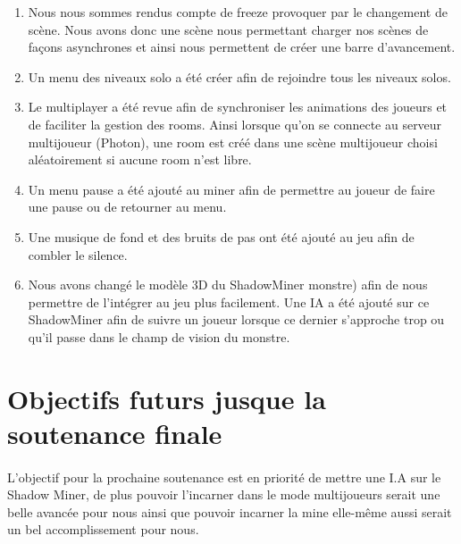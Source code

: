 \documentclass[titlepage, 13px, a4paper]{article}
\begin{document}
{\begin{enumerate}
		et ainsi conserver ces paramètres ou encore sauvegardé le token et l’email permettant la reconnexion au serveur. \\
	\item Nous nous sommes rendus compte de freeze provoquer par le changement de scène. Nous avons donc une scène 
		nous permettant charger nos scènes de façons asynchrones et ainsi nous permettent de créer une barre d’avancement. \\
	\item Un menu des niveaux solo a été créer afin de rejoindre tous les niveaux solos. \\
	\item Le multiplayer a été revue afin de synchroniser les animations des joueurs et de faciliter la gestion des rooms.
		Ainsi lorsque qu’on se connecte au serveur multijoueur (Photon), une room est créé dans une scène multijoueur 
		choisi aléatoirement si aucune room n’est libre. \\
	\item Un menu pause a été ajouté au miner afin de permettre au joueur de faire une pause ou de retourner au menu. \\
	\item Une musique de fond et des bruits de pas ont été ajouté au jeu afin de combler le silence. \\
	\item Nous avons changé le modèle 3D du ShadowMiner monstre) afin de nous permettre de l’intégrer au jeu plus facilement.
		Une IA a été ajouté sur ce ShadowMiner afin de suivre un joueur lorsque ce dernier s’approche trop ou qu’il passe 
		dans le champ de vision du monstre. \\

\end{enumerate}}


\newpage




\section{Objectifs futurs jusque la soutenance finale} 
\paragraph{} \hspace{0pt} 
L'objectif pour la prochaine soutenance est en priorité de mettre une I.A sur le Shadow Miner, de plus pouvoir l'incarner 
dans le mode multijoueurs serait une belle avancée pour nous ainsi que pouvoir incarner la mine elle-même aussi serait 
un bel accomplissement pour nous. \\
\end{document}
